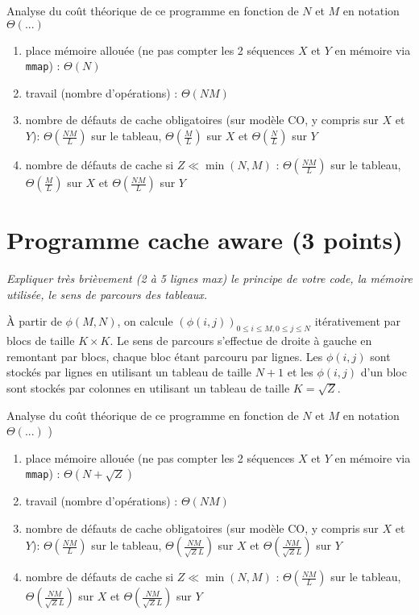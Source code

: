 \documentclass[10pt,a4paper]{article}
\begin{document}
Analyse du coût théorique de ce  programme en fonction de $N$ et $M$  en notation $\Theta(...)$ 
\begin{enumerate}
  \item place mémoire allouée (ne pas compter les 2 séquences $X$ et $Y$ en mémoire via {\tt mmap}) : $\Theta(N)$
  \item travail (nombre d'opérations) : $\Theta(NM)$
  \item nombre de défauts de cache obligatoires (sur modèle CO, y compris sur $X$ et $Y$): $\Theta \left( \frac{NM}{L} \right)$ sur le tableau, $\Theta \left( \frac{M}{L} \right)$ sur $X$ et $\Theta \left( \frac{N}{L} \right)$ sur $Y$
  \item nombre de défauts de cache si $Z \ll \min(N,M)$ : $\Theta \left( \frac{NM}{L} \right)$ sur le tableau, $\Theta \left( \frac{M}{L} \right)$ sur $X$ et $\Theta \left( \frac{NM}{L} \right)$ sur $Y$
\end{enumerate}

\section{Programme cache aware  (3 points)}
{\em Expliquer très brièvement (2 à 5 lignes max) le principe de votre code, la mémoire utilisée, le sens de parcours des tableaux.}

\medskip

À partir de $\phi(M,N)$, on calcule $\left( \phi(i,j) \right)_{0 \leqslant i \leqslant M, 0 \leqslant j \leqslant N}$ itérativement par blocs de taille $K \times K$. Le sens de parcours s'effectue de droite à gauche en remontant par blocs, chaque bloc étant parcouru par lignes. Les $\phi(i,j)$ sont stockés par lignes en utilisant un tableau de taille $N+1$ et les $\phi(i,j)$ d'un bloc sont stockés par colonnes en utilisant un tableau de taille $K = \sqrt{Z}$.

\medskip

Analyse du coût théorique de ce programme en fonction de $N$ et $M$  en notation $\Theta(...)$ )
\begin{enumerate}
  \item place mémoire allouée (ne pas compter les 2 séquences $X$ et $Y$ en mémoire via {\tt mmap}) : $\Theta(N + \sqrt{Z})$
  \item travail (nombre d'opérations) : $\Theta(NM)$
  \item nombre de défauts de cache obligatoires (sur modèle CO, y compris sur $X$ et $Y$): $\Theta \left( \frac{NM}{L} \right)$ sur le tableau, $\Theta \left( \frac{NM}{\sqrt{Z} L} \right)$ sur $X$ et $\Theta \left( \frac{NM}{\sqrt{Z} L} \right)$ sur $Y$
  \item nombre de défauts de cache si $Z \ll \min(N,M)$ : $\Theta \left( \frac{NM}{L} \right)$ sur le tableau, $\Theta \left( \frac{NM}{\sqrt{Z} L} \right)$ sur $X$ et $\Theta \left( \frac{NM}{\sqrt{Z} L} \right)$ sur $Y$
\end{enumerate}
\end{document}
